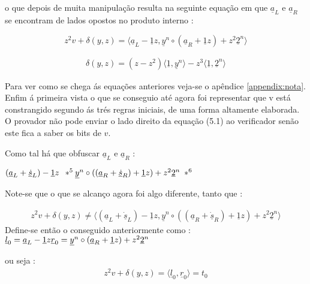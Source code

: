 o que depois de muita manipulação resulta na seguinte equação em que $\underline{a}_L$ e $\underline{a}_R$ se encontram de lados opostos no produto interno :  \newline

\begin{equation}
z^2 v + \delta(y,z) = \langle\underline{a}_L - \underline{1}z, \underline{y}^n \circ (\underline{a}_R + \underline{1}z) + z^2 \underline{2}^n\rangle 
\end{equation}

\begin{align*}
\delta(y,z) = (z - z^2)  \langle \underline{1}, \underline{y}^n \rangle - z^3 \langle \underline{1}, \underline{2}^n \rangle
\end{align*}

Para ver como se chega ás equações anteriores veja-se o apêndice \ref{appendix:nota}. Enfim á primeira vista o que se conseguio até agora foi representar que v está constrangido segundo ás trés regras iniciais, de uma forma altamente elaborada.\newline
O provador não pode enviar o lado direito da equação (5.1) ao verificador senão este fica a saber os bits de $v$.

Como tal há que obfuscar $\underline{a}_L$ e $\underline{a}_R$ :\newline

$(\underline{a}_L + \underline{\dot{s}}_L ) - \underline{1}z\enspace *^5\\
\underline{y}^n \circ ((\underline{a}_R + \underline{\dot{s}}_R) + \underline{1}z) + z^2 \underline{2}^n\enspace *^6$


Note-se que o que se alcanço agora foi algo diferente, tanto que : 

\begin{align*}
z^2 v + \delta(y,z) \neq \langle(\underline{a}_L + \underline{\dot{s}}_L) - \underline{1}z, \underline{y}^n \circ ((\underline{a}_R + \underline{\dot{s}}_R) + \underline{1}z) + z^2 \underline{2}^n\rangle 
\end{align*}
\newline
Define-se então o conseguido anteriormente como : \newline
$\underline{l}_0 = \underline{a}_L - \underline{1}z\\
\underline{r}_0 = \underline{y}^n \circ (\underline{a}_R + \underline{1}z) + z^2 \underline{2}^n$

ou seja :
\begin{align*}
z^2 v + \delta(y,z) = \langle \underline{l}_0, \underline{r}_0 \rangle = t_0
\end{align*}

